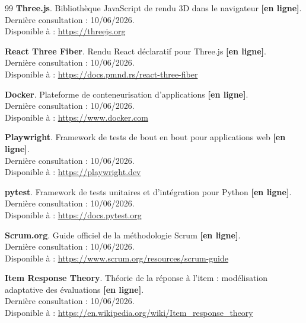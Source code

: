 \begin{thebibliography}{99}
\textbf{Three.js}. Bibliothèque JavaScript de rendu 3D dans le navigateur \textbf{[en ligne]}.\\
Dernière consultation : 10/06/2026.\\
Disponible à : \url{https://threejs.org}

\textbf{React Three Fiber}. Rendu React déclaratif pour Three.js \textbf{[en ligne]}.\\
Dernière consultation : 10/06/2026.\\
Disponible à : \url{https://docs.pmnd.rs/react-three-fiber}

\textbf{Docker}. Plateforme de conteneurisation d'applications \textbf{[en ligne]}.\\
Dernière consultation : 10/06/2026.\\
Disponible à : \url{https://www.docker.com}

\textbf{Playwright}. Framework de tests de bout en bout pour applications web \textbf{[en ligne]}.\\
Dernière consultation : 10/06/2026.\\
Disponible à : \url{https://playwright.dev}

\textbf{pytest}. Framework de tests unitaires et d'intégration pour Python \textbf{[en ligne]}.\\
Dernière consultation : 10/06/2026.\\
Disponible à : \url{https://docs.pytest.org}

\textbf{Scrum.org}. Guide officiel de la méthodologie Scrum \textbf{[en ligne]}.\\
Dernière consultation : 10/06/2026.\\
Disponible à : \url{https://www.scrum.org/resources/scrum-guide}

\textbf{Item Response Theory}. Théorie de la réponse à l'item : modélisation adaptative des évaluations \textbf{[en ligne]}.\\
Dernière consultation : 10/06/2026.\\
Disponible à : \url{https://en.wikipedia.org/wiki/Item_response_theory}

\end{thebibliography}

